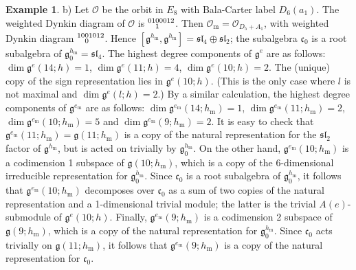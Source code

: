 \documentclass{amsart}
\theoremstyle{definition}
\newtheorem{example}[theorem]{Example}
\newcommand{\m}{\mathrm{m}}
\newcommand{\g}{\mathfrak{g}}
\newcommand{\cg}{\mathfrak{c}}
\newcommand{\0}{\mathcal{O}}
\begin{document}
\begin{example}
b) Let $\0$ be the orbit in $E_8$ with Bala-Carter label $D_6(a_1)$.
The weighted Dynkin diagram of $\0$ is $\scriptsize{\begin{aligned} 01 & 00012 \\[-1.8mm] & 1\end{aligned}}$.
Then $\0_\m=\0_{D_5+A_1}$, with weighted Dynkin diagram $\scriptsize{\begin{aligned} 10 & 01012 \\[-1.8mm] & 0 \end{aligned}}$.
Hence $[\g^{h_\m},\g^{h_\m}]=\mathfrak{sl}_4\oplus \mathfrak{sl}_2$; the subalgebra $\cg_0$ is a root subalgebra of $\g^{h_\m}_0=\mathfrak{sl}_4$.
The highest degree components of $\g^e$ are as follows: $\dim\g^e(14;h)=1$, $\dim\g^e(11;h)=4$, $\dim \g^e(10;h)=2$.
The (unique) copy of the sign representation lies in $\g^e(10;h)$.
(This is the only case where $l$ is not maximal and $\dim \g^e(l;h)=2$.)
By a similar calculation, the highest degree components of $\g^{e_\m}$ are as follows: $\dim\g^{e_\m}(14;h_\m)=1$, $\dim\g^{e_\m}(11;h_\m)=2$, $\dim \g^{e_\m}(10;h_\m)=5$ and $\dim \g^{e_\m}(9;h_\m)=2$.
It is easy to check that $\g^{e_\m}(11;h_\m)=\g(11;h_\m)$ is a copy of the natural representation for the $\mathfrak{sl}_2$ factor of $\g^{h_\m}$, but is acted on trivially by $\g^{h_\m}_0$.
On the other hand, $\g^{e_\m}(10;h_\m)$ is a codimension 1 subspace of $\g(10;h_\m)$, which is a copy of the 6-dimensional irreducible representation for $\g^{h_\m}_0$.
Since $\cg_0$ is a root subalgebra of $\g^{h_\m}_0$, it follows that $\g^{e_\m}(10;h_\m)$ decomposes over $\cg_0$ as a sum of two copies of the natural representation and a 1-dimensional trivial module; the latter is the trivial $A(e)$-submodule of $\g^e(10;h)$.
Finally, $\g^{e_\m}(9;h_\m)$ is a codimension 2 subspace of $\g(9;h_\m)$, which is a copy of the natural representation for $\g^{h_\m}_0$.
Since $\cg_0$ acts trivially on $\g(11;h_\m)$, it follows that $\g^{e_\m}(9;h_\m)$ is a copy of the natural representation for $\cg_0$.


\end{example}
\end{document}
